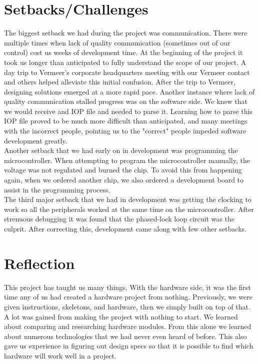 \documentclass[paper=a4, fontsize=11pt]{scrartcl}
\numberwithin{equation}{section}		%
\numberwithin{figure}{section}			%
\numberwithin{table}{section}				%
\begin{document}
\pagebreak
\section{Setbacks/Challenges} 
The biggest setback we had during the project was communication. There were multiple times when lack of quality communication (sometimes out of our control) cost us weeks of development time. At the beginning of the project it took us longer than anticipated to fully understand the scope of our project. A day trip to Vermeer's corporate headquarters meeting with our Vermeer contact and others helped alleviate this initial confusion. After the trip to Vermeer, designing solutions emerged at a more rapid pace. Another instance where lack of quality communication stalled progress was on the software side. We knew that we would receive and IOP file and needed to parse it. Learning how to parse this IOP file proved to be much more difficult than anticipated, and many meetings with the incorrect people, pointing us to the "correct" people impeded software development greatly. \\

Another setback that we had early on in development was programming the microcontroller. When attempting to program the microcontroller manually, the voltage was not regulated and burned the chip. To avoid this from happening again, when we ordered another chip, we also ordered a development board to assist in the programming process. \\

The third major setback that we had in development was getting the clocking to work so all the peripherals worked at the same time on the microcontroller. After strenuous debugging it was found that the phased-lock loop circuit was the culprit. After correcting this, development came along with few other setbacks. \\

\pagebreak
\section{Reflection}
This project has taught us many things. With the hardware side, it was the first time any of us had created a hardware project from nothing. Previously, we were given instructions, skeletons, and hardware, then we simply built on top of that. A lot was gained from making the project with nothing to start. We learned about comparing and researching hardware modules. From this alone we learned about numerous technologies that we had never even heard of before. This also gave us experience in figuring out design specs so that it is possible to find which hardware will work well in a project.\\
\end{document}
